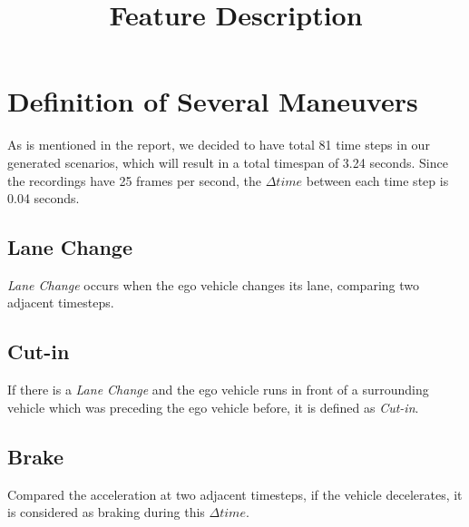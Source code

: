 \documentclass[conference]{IEEEtran}
\begin{document}
\title{Feature Description}

\author{
}

\maketitle
\section{Definition of Several Maneuvers}
As is mentioned in the report, we decided to have total 81 time steps in our generated scenarios, which will result in a total timespan of 3.24 seconds. Since the recordings have 25 frames per second, the $\Delta time$ between each time step is 0.04 seconds.
\subsection{Lane Change}
\textit{Lane Change} occurs when the ego vehicle changes its lane, comparing two adjacent timesteps.
\subsection{Cut-in}
If there is a \textit{Lane Change} and the ego vehicle runs in front of a surrounding vehicle which was preceding the ego vehicle before, it is defined as \textit{Cut-in}.
\subsection{Brake}
Compared the acceleration at two adjacent timesteps, if the vehicle decelerates, it is considered as braking during this $\Delta time$.
\end{document}
